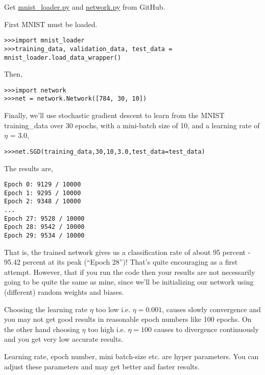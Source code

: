 \documentclass[]{article}
\begin{document}
Get
\href{https://github.com/mnielsen/neural-networks-and-deep-learning/blob/master/src/mnist_loader.py}{mnist\_loader.py}
and
\href{https://github.com/mnielsen/neural-networks-and-deep-learning/blob/master/src/network.py}{network.py}
from GitHub.

First MNIST must be loaded.

\begin{verbatim}
>>>import mnist_loader
>>>training_data, validation_data, test_data = mnist_loader.load_data_wrapper()
\end{verbatim}

Then,

\begin{verbatim}
>>>import network
>>>net = network.Network([784, 30, 10])
\end{verbatim}

Finally, we'll use stochastic gradient descent to learn from the MNIST
training\_data over 30 epochs, with a mini-batch size of 10, and a
learning rate of $ \eta $ = 3.0,

\begin{verbatim}
>>>net.SGD(training_data,30,10,3.0,test_data=test_data)
\end{verbatim}

The results are,

\begin{verbatim}
Epoch 0: 9129 / 10000
Epoch 1: 9295 / 10000
Epoch 2: 9348 / 10000
...
Epoch 27: 9528 / 10000
Epoch 28: 9542 / 10000
Epoch 29: 9534 / 10000
\end{verbatim}

That is, the trained network gives us a classification rate of about 95
percent - 95.42 percent at its peak (``Epoch 28'')! That's quite
encouraging as a first attempt. However, that if you run the code then
your results are not necessarily going to be quite the same as mine,
since we'll be initializing our network using (different) random weights
and biases.

Choosing the learning rate $ \eta $ too low i.e. $ \eta = 0.001
$, causes slowly convergence and you may not get good results in reasonable epoch numbers like 100 epochs. On the other hand choosing
$ \eta $ too high i.e. $ \eta = 100 $ causes to divergence continuously
and you get very low accurate results.

Learning rate, epoch number, mini batch-size etc. are hyper parameters.
You can adjust these parameters and may get better and faster results.
\end{document}
